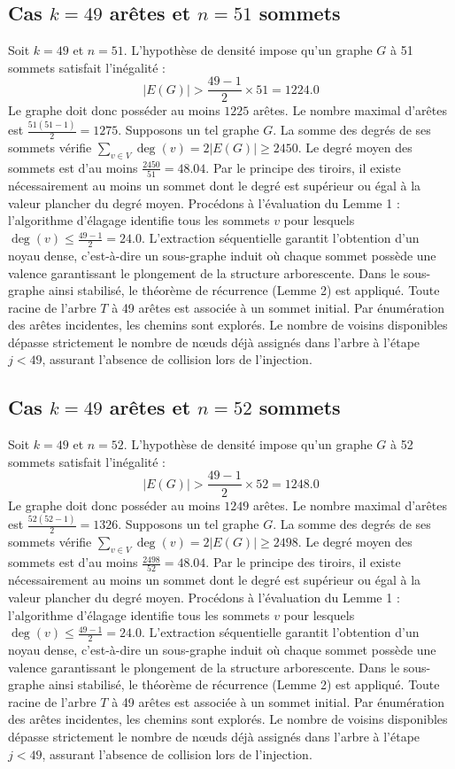 \documentclass[12pt,a4paper]{article}
\begin{document}
\subsection{Cas $k = 49$ arêtes et $n = 51$ sommets}
Soit $k = 49$ et $n = 51$. L'hypothèse de densité impose qu'un graphe $G$ à 51 sommets satisfait l'inégalité :
$$ |E(G)| > \frac{49-1}{2} \times 51 = 1224.0 $$
Le graphe doit donc posséder au moins $1225$ arêtes. Le nombre maximal d'arêtes est $\frac{51(51-1)}{2} = 1275$.
Supposons un tel graphe $G$. La somme des degrés de ses sommets vérifie $\sum_{v \in V} \deg(v) = 2|E(G)| \geq 2450$.
Le degré moyen des sommets est d'au moins $\frac{2450}{51} = 48.04$.
Par le principe des tiroirs, il existe nécessairement au moins un sommet dont le degré est supérieur ou égal à la valeur plancher du degré moyen.
Procédons à l'évaluation du Lemme 1 : l'algorithme d'élagage identifie tous les sommets $v$ pour lesquels $\deg(v) \leq \frac{49-1}{2} = 24.0$.
L'extraction séquentielle garantit l'obtention d'un noyau dense, c'est-à-dire un sous-graphe induit où chaque sommet possède une valence garantissant le plongement de la structure arborescente.
Dans le sous-graphe ainsi stabilisé, le théorème de récurrence (Lemme 2) est appliqué. Toute racine de l'arbre $T$ à 49 arêtes est associée à un sommet initial. Par énumération des arêtes incidentes, les chemins sont explorés. Le nombre de voisins disponibles dépasse strictement le nombre de nœuds déjà assignés dans l'arbre à l'étape $j < 49$, assurant l'absence de collision lors de l'injection.

\subsection{Cas $k = 49$ arêtes et $n = 52$ sommets}
Soit $k = 49$ et $n = 52$. L'hypothèse de densité impose qu'un graphe $G$ à 52 sommets satisfait l'inégalité :
$$ |E(G)| > \frac{49-1}{2} \times 52 = 1248.0 $$
Le graphe doit donc posséder au moins $1249$ arêtes. Le nombre maximal d'arêtes est $\frac{52(52-1)}{2} = 1326$.
Supposons un tel graphe $G$. La somme des degrés de ses sommets vérifie $\sum_{v \in V} \deg(v) = 2|E(G)| \geq 2498$.
Le degré moyen des sommets est d'au moins $\frac{2498}{52} = 48.04$.
Par le principe des tiroirs, il existe nécessairement au moins un sommet dont le degré est supérieur ou égal à la valeur plancher du degré moyen.
Procédons à l'évaluation du Lemme 1 : l'algorithme d'élagage identifie tous les sommets $v$ pour lesquels $\deg(v) \leq \frac{49-1}{2} = 24.0$.
L'extraction séquentielle garantit l'obtention d'un noyau dense, c'est-à-dire un sous-graphe induit où chaque sommet possède une valence garantissant le plongement de la structure arborescente.
Dans le sous-graphe ainsi stabilisé, le théorème de récurrence (Lemme 2) est appliqué. Toute racine de l'arbre $T$ à 49 arêtes est associée à un sommet initial. Par énumération des arêtes incidentes, les chemins sont explorés. Le nombre de voisins disponibles dépasse strictement le nombre de nœuds déjà assignés dans l'arbre à l'étape $j < 49$, assurant l'absence de collision lors de l'injection.
\end{document}
